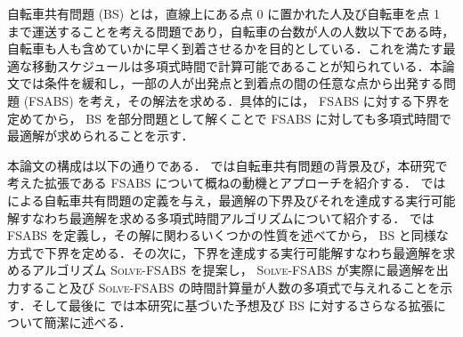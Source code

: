 自転車共有問題 (BS) とは，直線上にある点 0 に置かれた人及び自転車を点 1 まで運送することを考える問題であり，自転車の台数が人の人数以下である時，自転車も人も含めていかに早く到着させるかを目的としている．これを満たす最適な移動スケジュールは多項式時間で計算可能であることが知られている．本論文では条件を緩和し，一部の人が出発点と到着点の間の任意な点から出発する問題 (FSABS) を考え，その解法を求める．具体的には， FSABS に対する下界を定めてから， BS を部分問題として解くことで FSABS に対しても多項式時間で最適解が求められることを示す．

本論文の構成は以下の通りである． では自転車共有問題の背景及び，本研究で考えた拡張である FSABS について概ねの動機とアプローチを紹介する． では \textcite{czyzowicz} による自転車共有問題の定義を与え，最適解の下界及びそれを達成する実行可能解すなわち最適解を求める多項式時間アルゴリズムについて紹介する． では FSABS を定義し，その解に関わるいくつかの性質を述べてから， BS と同様な方式で下界を定める．その次に，下界を達成する実行可能解すなわち最適解を求めるアルゴリズム \textsc{Solve-FSABS} を提案し， \textsc{Solve-FSABS} が実際に最適解を出力すること及び \textsc{Solve-FSABS} の時間計算量が人数の多項式で与えれることを示す．そして最後に  では本研究に基づいた予想及び BS に対するさらなる拡張について簡潔に述べる．